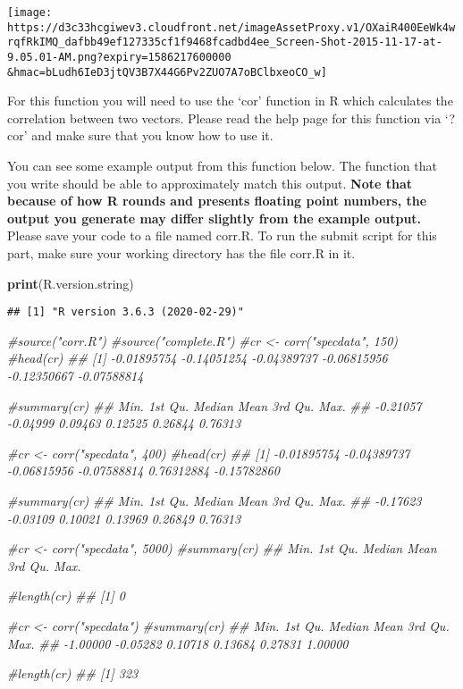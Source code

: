 \documentclass[
]{article}
\newenvironment{Shaded}{\begin{snugshade}}{\end{snugshade}}
\newcommand{\CommentTok}[1]{\textcolor[rgb]{0.56,0.35,0.01}{\textit{#1}}}
\newcommand{\KeywordTok}[1]{\textcolor[rgb]{0.13,0.29,0.53}{\textbf{#1}}}
\newcommand{\NormalTok}[1]{#1}
\begin{document}
\texttt{[image: https://d3c33hcgiwev3.cloudfront.net/imageAssetProxy.v1/OXaiR400EeWk4wrqfRkIMQ\_dafbb49ef127335cf1f9468fcadbd4ee\_Screen-Shot-2015-11-17-at-9.05.01-AM.png?expiry=1586217600000\\\&hmac=bLudh6IeD3jtQV3B7X44G6Pv2ZUO7A7oBClbxeoCO\_w]}

For this function you will need to use the `cor' function in R which
calculates the correlation between two vectors. Please read the help
page for this function via `?cor' and make sure that you know how to use
it.

You can see some example output from this function below. The function
that you write should be able to approximately match this output.
\textbf{Note that because of how R rounds and presents floating point
numbers, the output you generate may differ slightly from the example
output.} Please save your code to a file named corr.R. To run the submit
script for this part, make sure your working directory has the file
corr.R in it.

\begin{Shaded}
\begin{Highlighting}[]
\KeywordTok{print}\NormalTok{(R.version.string)}
\end{Highlighting}
\end{Shaded}

\begin{verbatim}
## [1] "R version 3.6.3 (2020-02-29)"
\end{verbatim}

\begin{Shaded}
\begin{Highlighting}[]
\CommentTok{#source("corr.R")}
\CommentTok{#source("complete.R")}
\CommentTok{#cr <- corr("specdata", 150)}
\CommentTok{#head(cr)}
\CommentTok{## [1] -0.01895754 -0.14051254 -0.04389737 -0.06815956 -0.12350667 -0.07588814}

\CommentTok{#summary(cr)}
\CommentTok{##     Min.  1st Qu.   Median     Mean  3rd Qu.     Max. }
\CommentTok{## -0.21057 -0.04999  0.09463  0.12525  0.26844  0.76313}

\CommentTok{#cr <- corr("specdata", 400)}
\CommentTok{#head(cr)}
\CommentTok{## [1] -0.01895754 -0.04389737 -0.06815956 -0.07588814  0.76312884 -0.15782860}

\CommentTok{#summary(cr)}
\CommentTok{##     Min.  1st Qu.   Median     Mean  3rd Qu.     Max. }
\CommentTok{## -0.17623 -0.03109  0.10021  0.13969  0.26849  0.76313}

\CommentTok{#cr <- corr("specdata", 5000)}
\CommentTok{#summary(cr)}
\CommentTok{##    Min. 1st Qu.  Median    Mean 3rd Qu.    Max. }

\CommentTok{#length(cr)}
\CommentTok{## [1] 0}

\CommentTok{#cr <- corr("specdata")}
\CommentTok{#summary(cr)}
\CommentTok{##     Min.  1st Qu.   Median     Mean  3rd Qu.     Max. }
\CommentTok{## -1.00000 -0.05282  0.10718  0.13684  0.27831  1.00000}

\CommentTok{#length(cr)}
\CommentTok{## [1] 323}
\end{Highlighting}
\end{Shaded}
\end{document}
